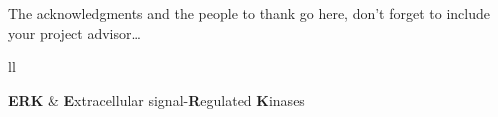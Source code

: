 \documentclass[
11pt, %
english, %
singlespacing, %
headsepline, %
]{MastersDoctoralThesis} %
\begin{document}

\begin{acknowledgements}
\addchaptertocentry{\acknowledgementname} %
The acknowledgments and the people to thank go here, don't forget to include your project advisor\ldots
\end{acknowledgements}


{
  \hypersetup{linkcolor=black} %
  \tableofcontents %
  \listoffigures %
  \listoftables %
}


\begin{abbreviations}{ll} %

\textbf{ERK} & \textbf{E}xtracellular signal-\textbf{R}egulated \textbf{K}inases\\

\end{abbreviations}


\mainmatter %

\pagestyle{thesis} %



\end{document}
